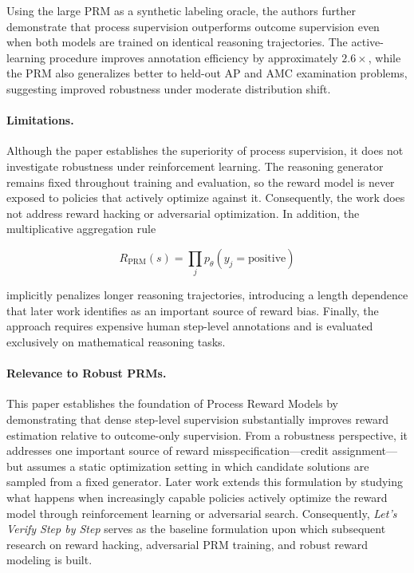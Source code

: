 \documentclass[11pt]{article}
\begin{document}
Using the large PRM as a synthetic labeling oracle, the authors further demonstrate that process supervision outperforms outcome supervision even when both models are trained on identical reasoning trajectories. The active-learning procedure improves annotation efficiency by approximately \(2.6\times\), while the PRM also generalizes better to held-out AP and AMC examination problems, suggesting improved robustness under moderate distribution shift.

\paragraph{Limitations.}
Although the paper establishes the superiority of process supervision, it does not investigate robustness under reinforcement learning. The reasoning generator remains fixed throughout training and evaluation, so the reward model is never exposed to policies that actively optimize against it. Consequently, the work does not address reward hacking or adversarial optimization. In addition, the multiplicative aggregation rule

\[
R_{\mathrm{PRM}}(s)
=
\prod_j
p_\theta(y_j=\mathrm{positive})
\]

implicitly penalizes longer reasoning trajectories, introducing a length dependence that later work identifies as an important source of reward bias. Finally, the approach requires expensive human step-level annotations and is evaluated exclusively on mathematical reasoning tasks.

\paragraph{Relevance to Robust PRMs.}
This paper establishes the foundation of Process Reward Models by demonstrating that dense step-level supervision substantially improves reward estimation relative to outcome-only supervision. From a robustness perspective, it addresses one important source of reward misspecification—credit assignment—but assumes a static optimization setting in which candidate solutions are sampled from a fixed generator. Later work extends this formulation by studying what happens when increasingly capable policies actively optimize the reward model through reinforcement learning or adversarial search. Consequently, \emph{Let's Verify Step by Step} serves as the baseline formulation upon which subsequent research on reward hacking, adversarial PRM training, and robust reward modeling is built.
\end{document}
